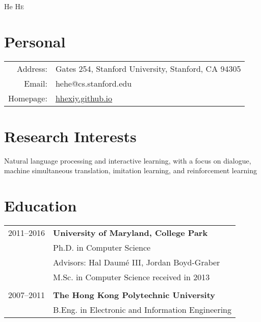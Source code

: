 \documentclass[a4paper,11pt]{article}
\begin{document}
\pagestyle{empty} %

\par{\centering
        {\Huge He \textsc{He}
    }\bigskip\par}

\section{Personal}

\begin{tabular}{rl}
    Address:   & Gates 254, Stanford University, Stanford, CA 94305 \\
    Email:     & hehe@cs.stanford.edu \\
	Homepage:  & \url{hhexiy.github.io}	
\end{tabular}

\section{Research Interests}
Natural language processing and interactive learning,
with a focus on
dialogue, machine simultaneous translation, imitation learning, and reinforcement learning

\section{Education}
\begin{tabular}{rl}    
2011--2016 & \textbf{University of Maryland, College Park}\\
& Ph.D. in Computer Science \\
& Advisors: Hal Daum\'e III, Jordan Boyd-Graber \\
& M.Sc. in Computer Science received in 2013 \\
\\
2007--2011 & \textbf{The Hong Kong Polytechnic University}\\
& B.Eng. in Electronic and Information Engineering
\end{tabular}
\end{document}
